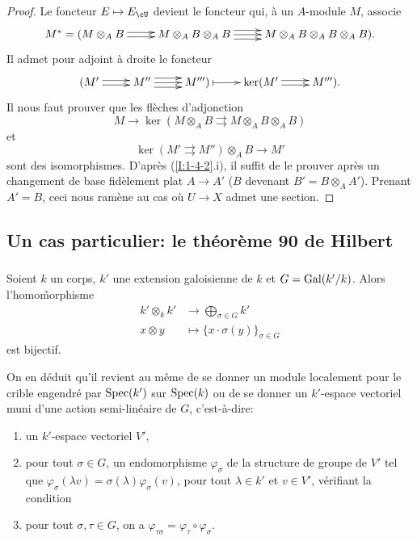 \begin{proof}
Le foncteur $E\mapsto E_\cU$ devient le foncteur qui, à un $A$-module $M$, 
associe 
\[\xymatrix{
  M^* = (M\otimes_A B \ar@<2pt>[r] \ar@<-2pt>[r] 
    & M\otimes_A B\otimes_A B \ar@<-4pt>[r] \ar[r] \ar@<4pt>[r] 
    & M\otimes_A B\otimes_A B\otimes_A B)\text{.}
}\]
Il admet pour adjoint à droite le foncteur
\[\xymatrix{
  (M' \ar@<2pt>[r] \ar@<-2pt>[r] 
    & M'' \ar@<-4pt>[r] \ar[r] \ar@<4pt>[r]
    & M''') \ar@{|->}[r] 
    & \ker(M' \ar@<2pt>[r] \ar@<-2pt>[r] 
    & M''')\text{.}
}\]
Il nous faut prouver que les flèches d'adjonction 
\[
  M \to\ker(M\otimes_A B\rightrightarrows M\otimes_A B\otimes_A B)
\]
et
\[
  \ker(M'\rightrightarrows M'')\otimes_A B \to M'
\]
sont des isomorphismes. D'après (\ref{I:1-4-2}.i), il suffit de le prouver 
après un changement de base fidèlement plat $A\to A'$ ($B$ devenant 
$B'=B\otimes_A A'$). Prenant $A'=B$, ceci nous ramène au cas où $U\to X$ 
admet une section. 
\end{proof}










\subsection{Un cas particulier: le théorème 90 de Hilbert}\label{I:1-5}





\subsubsection{}\label{I:1-5-1}

Soient $k$ un corps, $k'$ une extension galoisienne de $k$ et $G=\operatorname{Gal}(k'/k)$. 
Alors l'homo\~morphisme 
\begin{align*}
  k'\otimes_k k' &\to \bigoplus_{\sigma\in G} k' \\
  x\otimes y     &\mapsto \{x\cdot \sigma(y)\}_{\sigma\in G}
\end{align*}
est bijectif. 

On en déduit qu'il revient au même de se donner un module localement pour 
le crible engendré par $\operatorname{Spec}(k')$ sur $\operatorname{Spec}(k)$ ou de se donner un 
$k'$-espace vectoriel muni d'une action semi-linéaire de $G$, c'est-à-dire: 
\begin{enumerate}[\indent a)]
  \item un $k'$-espace vectoriel $V'$,
  \item pour tout $\sigma\in G$, un endomorphisme $\varphi_\sigma$ de la 
    structure de groupe de $V'$ tel que 
    $\varphi_\sigma(\lambda v) = \sigma(\lambda) \varphi_\sigma(v)$, pour 
    tout $\lambda\in k'$ et $v\in V'$, vérifiant la condition
  \item pour tout $\sigma,\tau\in G$, on a 
    $\varphi_{\tau\sigma} = \varphi_\tau\circ\varphi_\sigma$. 
\end{enumerate}

